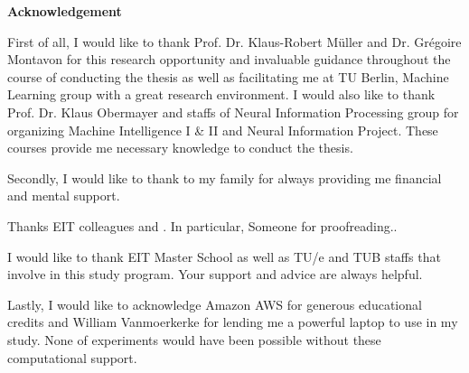 \thispagestyle{empty}
\vspace*{3cm}
\begin{center}
    \textbf{Acknowledgement}
\end{center}

First of all, I would like to thank Prof. Dr. Klaus-Robert M\"{u}ller and Dr. Gr\'{e}goire Montavon for this research opportunity and invaluable guidance throughout  the course of conducting the thesis as well as facilitating me at TU Berlin, Machine Learning group with a great research environment. I would also like to thank Prof. Dr. Klaus Obermayer and staffs of Neural Information Processing group for organizing Machine Intelligence I \& II and Neural Information Project. These courses provide me necessary knowledge to conduct the thesis.


Secondly, I would like to thank to my family for always providing me financial and mental support. 

Thanks EIT colleagues and . In particular, Someone for proofreading..

I would like to thank EIT Master School as well as TU/e and TUB staffs that involve in this study program.  Your support and advice are always helpful. 

Lastly, I would like to acknowledge Amazon AWS for generous educational credits and William Vanmoerkerke for lending me a powerful laptop to use in my study. None of experiments would have been possible without these computational support.